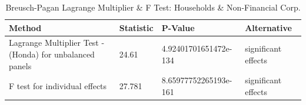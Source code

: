 \begin{table}[ht]
\centering
\caption{Breusch-Pagan Lagrange Multiplier  & F Test: Households & Non-Financial Corp.} 
\begingroup\small
\begin{tabular}{llll}
  \toprule
Method & Statistic & P-Value & Alternative \\ 
  \midrule
Lagrange Multiplier Test -  (Honda) for unbalanced panels & 24.61 & 4.92401701651472e-134 & significant effects \\ 
  F test for individual effects & 27.781 & 8.65977752265193e-161 & significant effects \\ 
   \bottomrule
\end{tabular}
\endgroup
\end{table}
